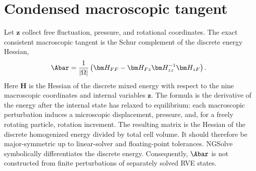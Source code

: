\section{Condensed macroscopic tangent}

Let \(\bm z\) collect free fluctuation, pressure, and rotational coordinates.
The exact consistent macroscopic tangent is the Schur complement of the
discrete energy Hessian,
\begin{equation}
  \Abar
  =
  \frac{1}{|\Omega|}
  \left(
    \bm H_{FF}
    -\bm H_{Fz}\bm H_{zz}^{-1}\bm H_{zF}
  \right).
  \label{eq:schur}
\end{equation}
Here \(\bm H\) is the Hessian of the discrete mixed energy with respect to the
nine macroscopic coordinates and internal variables \(\bm z\). The formula
is the derivative of the energy after the internal state has relaxed to
equilibrium: each macroscopic perturbation induces a microscopic
displacement, pressure, and, for a freely rotating particle, rotation
increment. The resulting matrix is the Hessian of the discrete
homogenized energy divided by total cell volume. It should therefore be
major-symmetric up to linear-solver and floating-point tolerances.
NGSolve symbolically differentiates the discrete energy. Consequently,
\(\Abar\) is not constructed from finite perturbations of separately solved
RVE states.

